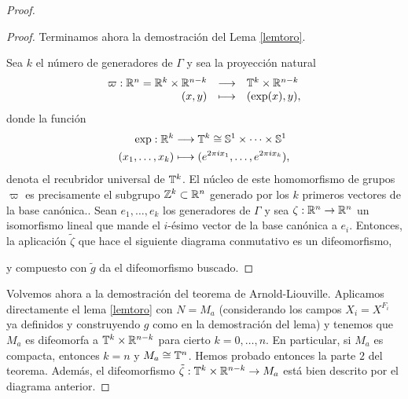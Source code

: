 \begin{proof}
\begin{proof}
Terminamos ahora la demostración del Lema \ref{lemtoro}.
 
  Sea $k$ el número de generadores de $\Gamma$ y sea la proyección natural
  \[
    \begin{array}{rcl}
      \varpi: \mathbb{R}^n = \mathbb{R}^k \times \mathbb{R}^{n-k} & \longrightarrow & \mathbb{T}^k \times \mathbb{R}^{n-k} \\
      (x,y) & \longmapsto & (\exp(x), y),
    \end{array}
  \]
  donde la función
  \begin{align*}
    \exp :\mathbb{R}^k&\longrightarrow \mathbb{T}^k \cong \mathbb{S}^1 \times \cdots \times \mathbb{S}^1\\ 
    (x_1,\dots,x_k) &\longmapsto (e^{2\pi ix_1},\dots,e^{ 2\pi ix_k}), 
    \end{align*}
    denota el recubridor universal de $\mathbb{T}^k$.
  El núcleo de este homomorfismo de grupos $\varpi$ es precisamente el subgrupo $\mathbb{Z}^k\subset \mathbb{R}^n$ generado por los $k$ primeros vectores de la base canónica.. 
  Sean $e_1,\dots,e_k$ los generadores de $\Gamma$ y sea $\zeta:\mathbb{R}^n \rightarrow \mathbb{R}^n$ un isomorfismo lineal que mande el $i$-ésimo vector de la base canónica a $e_i$. Entonces, la aplicación $\tilde{\zeta}$ que hace el siguiente diagrama conmutativo es un difeomorfismo,
  \begin{center}
   \end{center}
   y compuesto con $\tilde{g}$ da el difeomorfismo buscado.
\end{proof}

Volvemos ahora a la demostración del teorema de Arnold-Liouville. Aplicamos directamente el lema \ref{lemtoro} con $N=M_a$ (considerando los campos $X_i=X^{F_i}$ ya definidos y construyendo $g$ como en la demostración del lema) y tenemos que $M_a$ es difeomorfa a $\mathbb{T}^k\times \mathbb{R}^{n-k}$ para cierto $k=0,\dots,n$. En particular, si $M_a$ es compacta, entonces $k=n$ y $M_a\cong \mathbb{T}^n$. Hemos probado entonces la parte $2$ del teorema. Además, el difeomorfismo $\tilde{\zeta}:\mathbb{T}^k\times \mathbb{R}^{n-k} \rightarrow M_a$ está bien descrito por el diagrama anterior.


\end{proof}
